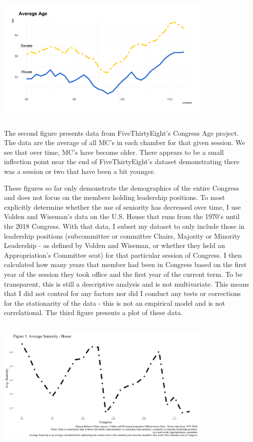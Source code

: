 \documentclass [12pt]{article}
\begin{document}
{{\includegraphics[height=250, width=400]{../figures/age-over-time}

The second figure presents data from FiveThirtyEight's Congress Age project. The data are the average of all MC's in each chamber for that given session. We see that over time, MC's have become older. There appears to be a small inflection point near the end of FiveThirtyEight's dataset demonstrating there was a session or two that have been a bit younger.

These figures so far only demonstrate the demographics of the entire Congress and does not focus on the members holding leadership positions. To most explicitly determine whether the use of seniority has decreased over time, I use Volden and Wiseman's data on the U.S. House that runs from the 1970's until the 2018 Congress. With that data, I subset my dataset to only include those in leadership positions (subcommittee or committee Chairs, Majority or Minority Leadership - as defined by Volden and Wiseman, or whether they held an Appropriation's Committee seat) for that particular session of Congress. I then calculated how many years that member had been in Congress based on the first year of the session they took office and the first year of the current term. To be transparent, this is still a descriptive analysis and is not multivariate. This means that I did not control for any factors nor did I conduct any tests or corrections for the stationarity of the data - this is not an empirical model and is not correlational. The third figure presents a plot of these data.

\includegraphics[height=250,width=400]{../figures/avg-house-seniority-macro.png}

}}
\end{document}
